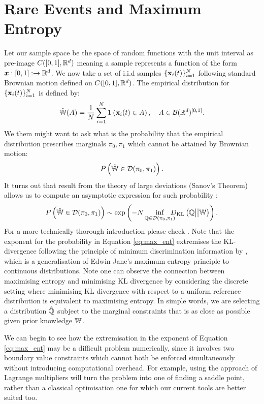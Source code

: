 \documentclass[a4paper,12pt,twoside,openright]{report}
\theoremstyle{definition}
\begin{document}
\section{Rare Events and Maximum Entropy }

Let our sample space be the space of random functions with the unit interval as pre-image $C([0,1], {\mathbb{R}}^d)$ meaning a sample  represents a function of the form ${\bm{x}} : [0, 1]:  \rightarrow {\mathbb{R}}^d$.  We now take a set of i.i.d samples $\{{\mathbf{x}}_{i}(t)\}_{i=1}^N$ following standard Brownian motion defined on $C([0,1], {\mathbb{R}}^d)$. The empirical distribution for $\{{\mathbf{x}}_{i}(t)\}_{i=1}^N$ is defined by:
\begin{align}\label{eq:empirical}
    \hat{\mathbb{W}}(A) = \frac{1}{N}\sum_{i=1}^N {\bm{1}}\left({\mathbf{x}}_i(t) \in A\right)  , \quad A \in {\mathcal{B}}({\mathbb{R}}^d)^{[0,1]}.
\end{align}
We them might want to ask what is the probability that the empirical distribution prescribes marginals $\pi_0, \pi_1$ which cannot be attained by Brownian motion:
\begin{align}
    {P}\left(\hat{\mathbb{W}} \in \mathcal{D}(\pi_0, \pi_1) \right).
\end{align}
It turns out that result from the theory of large deviations (Sanov's Theorem) allows us to compute an asymptotic expression for such probability \citep{leonard2012schrodinger}:
\begin{align} \label{eq:max_ent}
    {P}\left(\hat{\mathbb{W}} \in \mathcal{D}(\pi_0, \pi_1) \right) \sim \exp\left(-N\inf_{{\mathbb{Q}} \in {\mathcal{D}}(\pi_0, \pi_1)} \!\!\!\!\!D_{\mathrm{KL}}\left({\mathbb{Q}} \big|\big| \mathbb{W}\right)\right).
\end{align}
For a more technically thorough introduction please check \cite{leonard2013survey}. Note that the exponent for the probability in Equation \ref{eq:max_ent} extremises the KL-divergence following the principle of minimum discrimination information by \cite{kullback1997information}, which is a generalisation of Edwin Jane's maximum entropy principle \citep{jaynes1957information,jaynes2003probability} to continuous distributions. Note one can observe the connection between maximising entropy and minimising KL divergence by considering the discrete setting where minimising KL divergence with respect to a uniform reference distribution is equivalent to maximising entropy. In simple words, we are selecting a distribution $\hat{{\mathbb{Q}}}$ subject to the marginal constraints that is as close as possible given prior knowledge $\mathbb{W}$.

We can begin to see how the extremisation in the exponent of Equation \ref{eq:max_ent} may be a difficult problem numerically, since it involves two boundary value constraints which cannot both be enforced simultaneously without introducing computational overhead. For example, using the approach of Lagrange multipliers will turn the problem into one of finding a saddle point, rather than a classical optimisation one for which our current tools are better suited too.
\end{document}

